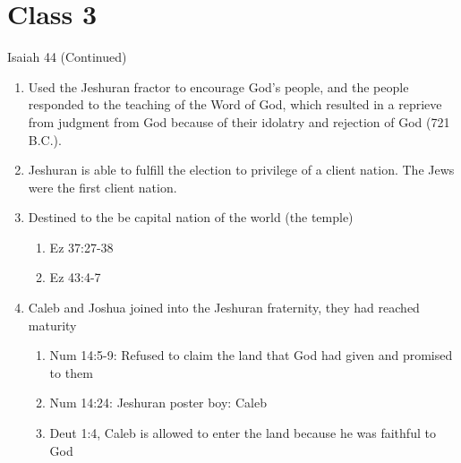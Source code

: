 \documentclass[11pt]{article}
\begin{document}
\section*{Class 3}
Isaiah 44 (Continued)
\begin{enumerate}
	\item Used the Jeshuran fractor to encourage God's people, and the people responded to the teaching of the Word of God, which resulted in a reprieve from judgment from God because of their idolatry and rejection of God (721 B.C.).
	\item Jeshuran is able to fulfill the election to privilege of a client nation. The Jews were the first client nation.
	\item Destined to the be capital nation of the world (the temple)
	\begin{enumerate}
		\item Ez 37:27-38
		\item Ez 43:4-7
	\end{enumerate} 
	\item Caleb and Joshua joined into the Jeshuran fraternity, they had reached maturity
	\begin{enumerate}
		\item Num 14:5-9: Refused to claim the land that God had given and promised to them
		\item Num 14:24: Jeshuran poster boy: Caleb
		\item Deut 1:4, Caleb is allowed to enter the land because he was faithful to God
	

\end{enumerate}
\end{enumerate}
\end{document}
